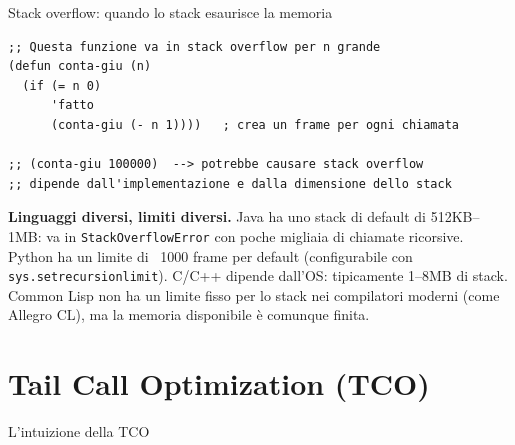 
\begin{concetto}{Stack overflow: quando lo stack esaurisce la memoria}

\end{concetto}

\begin{esempio}
\begin{lstlisting}
;; Questa funzione va in stack overflow per n grande
(defun conta-giu (n)
  (if (= n 0)
      'fatto
      (conta-giu (- n 1))))   ; crea un frame per ogni chiamata

;; (conta-giu 100000)  --> potrebbe causare stack overflow
;; dipende dall'implementazione e dalla dimensione dello stack
\end{lstlisting}
\end{esempio}

\begin{confronto}
\textbf{Linguaggi diversi, limiti diversi.}
Java ha uno stack di default di 512KB--1MB: va in \texttt{StackOverflowError}
con poche migliaia di chiamate ricorsive.
Python ha un limite di ~1000 frame per default (configurabile con
\texttt{sys.setrecursionlimit}).
C/C++ dipende dall'OS: tipicamente 1--8MB di stack.
Common Lisp non ha un limite fisso per lo stack nei compilatori moderni
(come Allegro CL), ma la memoria disponibile è comunque finita.
\end{confronto}

\section{Tail Call Optimization (TCO)}

\begin{concetto}{L'intuizione della TCO}

\end{concetto}


